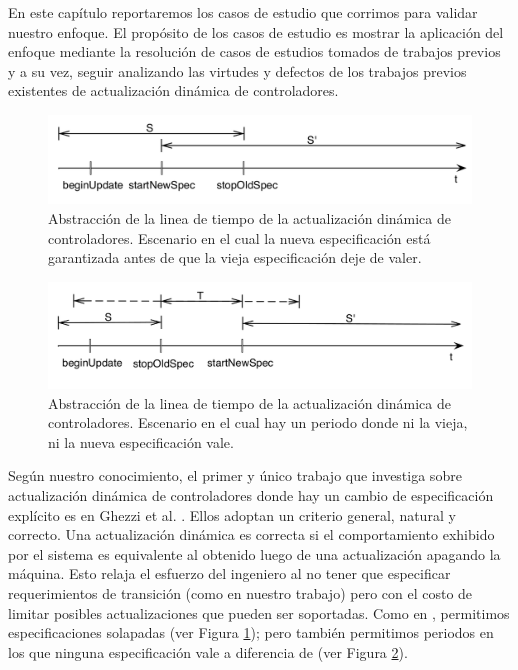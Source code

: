 En este capítulo reportaremos los casos de estudio que corrimos para validar nuestro enfoque. El propósito de los casos
de estudio es mostrar la aplicación del enfoque mediante la resolución de casos de estudios tomados de trabajos previos
y a su vez, seguir analizando las virtudes y defectos de los trabajos previos existentes de actualización dinámica de
controladores.

\begin{figure}
\centering
\includegraphics[scale=0.35]{img/overlaping.png}
\caption{Abstracción de la linea de tiempo de la actualización dinámica de controladores. Escenario en el cual la nueva
especificación está garantizada antes de que la vieja especificación deje de valer.}
\label{overlaping}
\end{figure}

\begin{figure}
\centering
\includegraphics[scale=0.35]{img/transition.png}
\caption{Abstracción de la linea de tiempo de la actualización dinámica de controladores. Escenario en el cual hay un
periodo donde ni la vieja, ni la nueva especificación vale.}
\label{transition}
\end{figure}

Según nuestro conocimiento, el primer y único trabajo que investiga sobre actualización dinámica de controladores donde
hay un cambio de especificación explícito es en Ghezzi et al. \cite{6224401}. Ellos adoptan un criterio general,
natural y correcto. Una actualización dinámica es correcta si el comportamiento exhibido por el sistema es equivalente
al obtenido luego de una actualización apagando la máquina. Esto relaja el esfuerzo del ingeniero al no tener que
especificar requerimientos de transición (como en nuestro trabajo) pero con el costo de limitar posibles actualizaciones
que pueden ser soportadas. Como en \cite{6224401}, permitimos especificaciones solapadas (ver Figura \ref{overlaping}); pero
también permitimos periodos en los que ninguna especificación vale a diferencia de \cite{6224401} (ver Figura
\ref{transition}).

